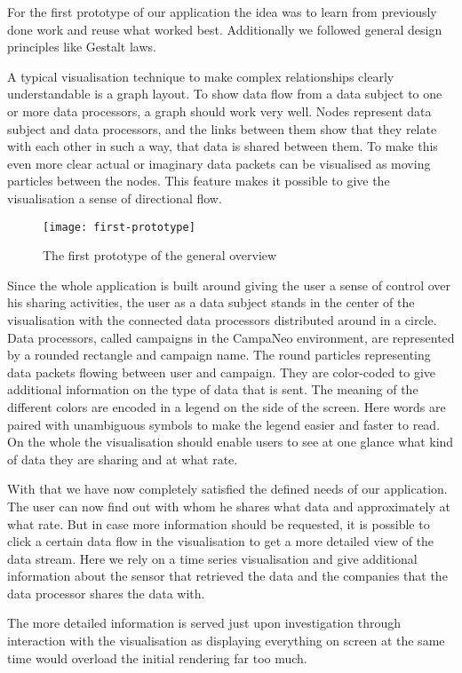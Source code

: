 
For the first prototype of our application the idea was to learn from
previously done work and reuse what worked best. Additionally we followed
general design principles like Gestalt laws.

A typical visualisation technique to make complex relationships clearly
understandable is a graph layout. To show data flow from a data subject to one
or more data processors, a graph should work very well.  Nodes represent data
subject and data processors, and the links between them show that they relate
with each other in such a way, that data is shared between them.  To make this
even more clear actual or imaginary data packets can be visualised as moving
particles between the nodes.  This feature makes it possible to give the
visualisation a sense of directional flow.
\begin{figure}
    \centering
    \texttt{[image: first-prototype]} \caption{The first prototype of the general overview}
    \label{fig:prototype}
\end{figure}

Since the whole application is built around giving the user a sense of control
over his sharing activities, the user as a data subject stands in the center of
the visualisation with the connected data processors distributed around in a
circle.  Data processors, called campaigns in the CampaNeo environment, are
represented by a rounded rectangle and campaign name. The round particles
representing data packets flowing between user and campaign. They are
color-coded to give additional information on the type of data that is sent.
The meaning of the different colors are encoded in a legend on the side of the
screen. Here words are paired with unambiguous symbols to make the legend
easier and faster to read.  On the whole the visualisation should enable users
to see at one glance what kind of data they are sharing and at what rate.

With that we have now completely satisfied the defined needs of our
application.  The user can now find out with whom he shares what data and
approximately at what rate.  But in case more information should be requested,
it is possible to click a certain data flow in the visualisation to get a more
detailed view of the data stream.  Here we rely on a time series visualisation
and give additional information about the sensor that retrieved the data and
the companies that the data processor shares the data with.

The more detailed information is served just upon investigation through
interaction with the visualisation as displaying everything on screen at the
same time would overload the initial rendering far too much.

